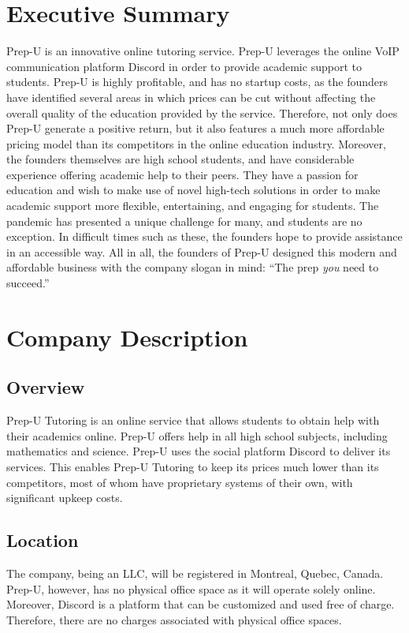 \documentclass{business}
\begin{document}
    \maketitle
    \tableofcontents
    \newpage
    \section{Executive Summary}
    Prep-U is an innovative online tutoring service. Prep-U leverages the online VoIP communication platform Discord in order to provide academic support to students. Prep-U is highly profitable, and has no startup costs, as the founders have identified several areas in which prices can be cut without affecting the overall quality of the education provided by the service. Therefore, not only does Prep-U generate a positive return, but it also features a much more affordable pricing model than its competitors in the online education industry. Moreover, the founders themselves are high school students, and have considerable experience offering academic help to their peers. They have a passion for education and wish to make use of novel high-tech solutions in order to make academic support more flexible, entertaining, and engaging for students. The pandemic has presented a unique challenge for many, and students are no exception. In difficult times such as these, the founders hope to provide assistance in an accessible way. All in all, the founders of Prep-U designed this modern and affordable business with the company slogan in mind: ``The prep \emph{you} need to succeed.''
    \section{Company Description}
    \subsection{Overview}
    Prep-U Tutoring is an online service that allows students to obtain help with their academics online. Prep-U offers help in all high school subjects, including mathematics and science. Prep-U uses the social platform Discord to deliver its services. This enables Prep-U Tutoring to keep its prices much lower than its competitors, most of whom have proprietary systems of their own, with significant upkeep costs.
    \subsection{Location}
    The company, being an LLC, will be registered in Montreal, Quebec, Canada. Prep-U, however, has no physical office space as it will operate solely online. Moreover, Discord is a platform that can be customized and used free of charge. Therefore, there are no charges associated with physical office spaces. 
\end{document}
